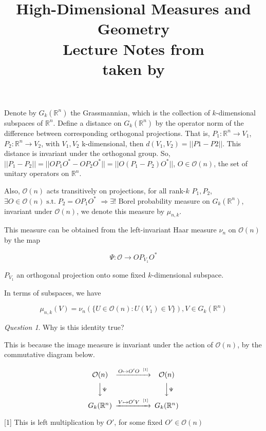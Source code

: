 \documentclass[12pt]{article}
\date{} %
\author{} %
\title{{\bf High-Dimensional Measures and Geometry}\\
Lecture Notes from \lecdat\\[0.1cm] \small taken by \notesby}
\theoremstyle{remark}
\newtheorem{question}[thm]{Question}
\newcommand{\reals}[0] { \mathbb{R}}
\newcommand{\cO}[0] { \mathcal{O} } %
\newcommand{\st}[0]{ \; \textrm{s.t.} \; }
\newcommand{\rimply}[0] { \Rightarrow }
\newcommand{\rarw}[0] { \rightarrow }
\begin{document}
\maketitle



Denote by $G_k( \reals^n )$ the Grassmannian, which is the collection of $k$-dimensional subspaces of $\reals^n$.
Define a distance on $G_k( \reals^n )$ by the operator norm of the difference between corresponding orthogonal projections.
That is, $P_1 : \reals^n \rarw V_1$, $P_2 : \reals^n \rarw V_2$, with $V_1, V_2$ k-dimensional, then $d(V_1, V_2) = ||P1-P2||$.
This distance is invariant under the orthogonal group. So, $||P_1-P_2|| = ||  O P_1 O^* - O P_2 O^* || = ||  O (P_1 - P_2) O^* ||$, $O \in \cO(n)$, the set of unitary operators on $\reals^n$.

Also, $\cO(n)$ acts transitively on projections, for all rank-$k$ $P_1, P_2$, $\exists O \in \cO(n) \st P_2 = O P_1 O^*$ $\rimply \exists !$ Borel probability measure on $G_k( \reals^n )$, invariant under $\cO(n)$, we denote this measure by $\mu_{n,k}$.

This measure can be obtained from the left-invariant Haar measure $\nu_n$ on $\cO(n)$ by the map

$$
    \Psi: \cO \rarw O P_{V_1} O^*
$$

$P_{V_1}$ an orthogonal projection onto some fixed $k$-dimensional subspace.

In terms of subspaces, we have 

$$
	\mu_{n,k}(V) = \nu_n ( \{  U \in \cO(n): U(V_1) \in V \} ), V \in G_k( \reals^n )
$$

\begin{question}
Why is this identity true?

This is because the image measure is invariant under the action of $\cO(n)$, by the commutative diagram below.
\end{question}


\begin{equation}
\begin{CD}
\cO(n) @>{ O \mapsto O'O \; \; ^{[1]}  }>> \cO(n) \\
@VV{ \Psi }V         @VV{\Psi  }V \\
G_k(\reals^n) @>{ V \mapsto O' V  \; \; ^{[1]} }>> G_k(\reals^n)
\end{CD}
\end{equation}

[1] This is left multiplication by $O'$, for some fixed $O' \in \cO(n)$\\
\end{document}

